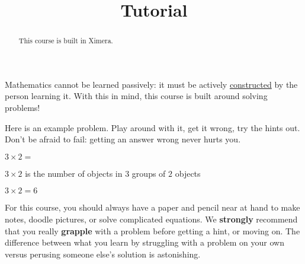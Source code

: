 \documentclass{ximera}
\title{Tutorial}
\begin{document}
\begin{abstract}
  This course is built in Ximera.
\end{abstract}\maketitle

Mathematics cannot be learned passively: it must be actively
\href{http://en.wikipedia.org/wiki/Constructivism_(philosophy_of_education)}{constructed}
by the person learning it.  With this in mind, this course
is built around solving problems!

Here is an example problem.  Play around with it, get it wrong, try
the hints out.  Don't be afraid to fail: getting an answer wrong never
hurts you.

\begin{question}
    $3\times 2 = $ 
   
    \begin{hint}
      $3 \times 2$ is the number of objects in $3$ groups of $2$ objects
    \end{hint}
    \begin{hint}
    \end{hint}
    \begin{hint}
      $3\times 2=6$
    \end{hint}
\end{question}

For this course, you should always have a paper and pencil near at hand to make notes, doodle pictures, or solve complicated equations.
We \textbf{strongly} recommend that you really \textbf{grapple} with a problem before getting a hint, or moving on.  
The difference between what you learn by struggling with a problem on your own versus perusing someone else's solution is astonishing.
\end{document}
